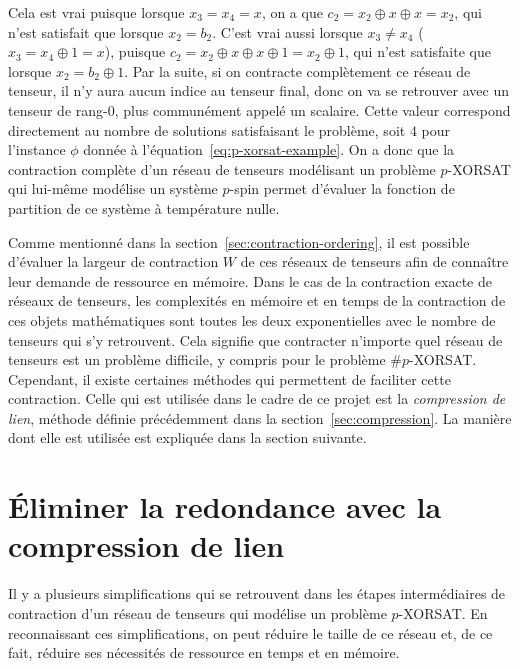 Cela est vrai puisque lorsque $x_3 = x_4 = x$, on a que $c_2 = x_2 \oplus x \oplus x = x_2$, qui n'est satisfait que lorsque $x_2 = b_2$.
C'est vrai aussi lorsque $x_3 \ne x_4$ ($x_3 = x_4 \oplus 1 = x$), puisque $c_2 = x_2 \oplus x \oplus x \oplus 1 = x_2 \oplus 1$, qui n'est satisfaite que lorsque $x_2 = b_2 \oplus 1$.
Par la suite, si on contracte complètement ce réseau de tenseur, il n'y aura aucun indice au tenseur final, donc on va se retrouver avec un tenseur de rang-$0$, plus communément appelé un scalaire.
Cette valeur correspond directement au nombre de solutions satisfaisant le problème, soit $4$ pour l'instance $\phi$ donnée à l'équation~\ref{eq:p-xorsat-example}.
On a donc que la contraction complète d'un réseau de tenseurs modélisant un problème $p$-XORSAT qui lui-même modélise un système $p$-spin permet d'évaluer la fonction de partition de ce système à température nulle.

Comme mentionné dans la section~\ref{sec:contraction-ordering}, il est possible d'évaluer la largeur de contraction $W$ de ces réseaux de tenseurs afin de connaître leur demande de ressource en mémoire.
Dans le cas de la contraction exacte de réseaux de tenseurs, les complexités en mémoire et en temps de la contraction de ces objets mathématiques sont toutes les deux exponentielles avec le nombre de tenseurs qui s'y retrouvent.
Cela signifie que contracter n'importe quel réseau de tenseurs est un problème difficile, y compris pour le problème \#$p$-XORSAT.
Cependant, il existe certaines méthodes qui permettent de faciliter cette contraction.
Celle qui est utilisée dans le cadre de ce projet est la \emph{compression de lien}, méthode définie précédemment dans la section~\ref{sec:compression}.
La manière dont elle est utilisée est expliquée dans la section suivante.



\section{Éliminer la redondance avec la compression de lien}\label{sec:eliminate-redundancy-with-bond-compression}
Il y a plusieurs simplifications qui se retrouvent dans les étapes intermédiaires de contraction d'un réseau de tenseurs qui modélise un problème $p$-XORSAT.
En reconnaissant ces simplifications, on peut réduire le taille de ce réseau et, de ce fait, réduire ses nécessités de ressource en temps et en mémoire.


